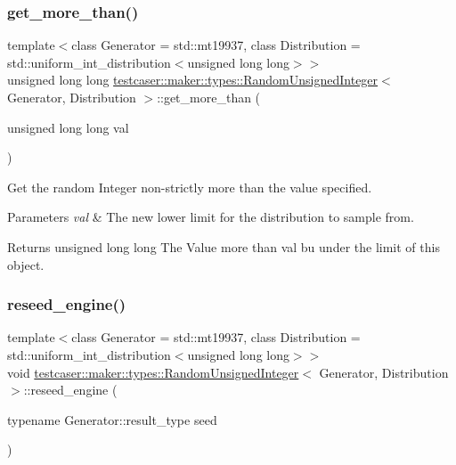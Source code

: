 \subsubsection{\texorpdfstring{get\_more\_than()}{get\_more\_than()}}
{\footnotesize\ttfamily template$<$class Generator = std\+::mt19937, class Distribution = std\+::uniform\+\_\+int\+\_\+distribution$<$unsigned long long$>$$>$ \\
unsigned long long \mbox{\hyperlink{classtestcaser_1_1maker_1_1types_1_1RandomUnsignedInteger}{testcaser\+::maker\+::types\+::\+Random\+Unsigned\+Integer}}$<$ Generator, Distribution $>$\+::get\+\_\+more\+\_\+than (\begin{DoxyParamCaption}\item[{unsigned long long}]{val }\end{DoxyParamCaption})\hspace{0.3cm}{\ttfamily [inline]}}



Get the random Integer non-\/strictly more than the value specified. 


\begin{DoxyParams}{Parameters}
{\em val} & The new lower limit for the distribution to sample from. \\
\hline
\end{DoxyParams}
\begin{DoxyReturn}{Returns}
unsigned long long The Value more than val bu under the limit of this object. 
\end{DoxyReturn}
\mbox{\label{classtestcaser_1_1maker_1_1types_1_1RandomUnsignedInteger_ac0ec747e5fe2701bd3533866e97ffcf7}} 
\subsubsection{\texorpdfstring{reseed\_engine()}{reseed\_engine()}}
{\footnotesize\ttfamily template$<$class Generator = std\+::mt19937, class Distribution = std\+::uniform\+\_\+int\+\_\+distribution$<$unsigned long long$>$$>$ \\
void \mbox{\hyperlink{classtestcaser_1_1maker_1_1types_1_1RandomUnsignedInteger}{testcaser\+::maker\+::types\+::\+Random\+Unsigned\+Integer}}$<$ Generator, Distribution $>$\+::reseed\+\_\+engine (\begin{DoxyParamCaption}\item[{typename Generator\+::result\+\_\+type}]{seed }\end{DoxyParamCaption})\hspace{0.3cm}{\ttfamily [inline]}}



